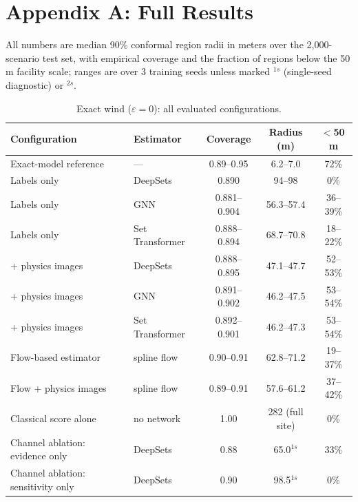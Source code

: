 \documentclass[conference]{IEEEtran}
\begin{document}
\onecolumn
\appendix
\section*{Appendix A: Full Results}
All numbers are median 90\% conformal region radii in meters over the
2{,}000-scenario test set, with empirical coverage and the fraction of
regions below the 50\,m facility scale; ranges are over 3 training seeds
unless marked $^{1s}$ (single-seed diagnostic) or $^{2s}$.

\begin{table}[h]
\centering
\caption{Exact wind ($\varepsilon=0$): all evaluated configurations.}
\begin{tabular}{llccc}
\toprule
Configuration & Estimator & Coverage & Radius (m) & $<$50\,m \\
\midrule
Exact-model reference & --- & 0.89--0.95 & 6.2--7.0 & 72\% \\
Labels only & DeepSets & 0.890 & 94--98 & 0\% \\
Labels only & GNN & 0.881--0.904 & 56.3--57.4 & 36--39\% \\
Labels only & Set Transformer & 0.888--0.894 & 68.7--70.8 & 18--22\% \\
+ physics images & DeepSets & 0.888--0.895 & 47.1--47.7 & 52--53\% \\
+ physics images & GNN & 0.891--0.902 & 46.2--47.5 & 53--54\% \\
+ physics images & Set Transformer & 0.892--0.901 & 46.2--47.3 & 53--54\% \\
Flow-based estimator & spline flow & 0.90--0.91 & 62.8--71.2 & 19--37\% \\
Flow + physics images & spline flow & 0.89--0.91 & 57.6--61.2 & 37--42\% \\
Classical score alone & no network & 1.00 & 282 (full site) & 0\% \\
\midrule
Channel ablation: evidence only & DeepSets & 0.88 & 65.0$^{1s}$ & 33\% \\
Channel ablation: sensitivity only & DeepSets & 0.90 & 98.5$^{1s}$ & 0\% \\
\bottomrule
\end{tabular}
\end{table}
\end{document}
